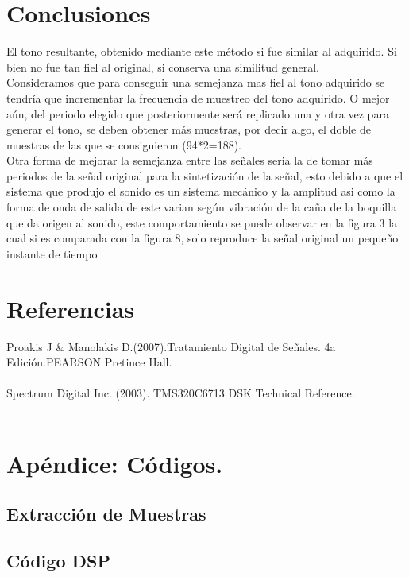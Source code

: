 \documentclass[12pt]{article}
\begin{document}
\section{Conclusiones}
El tono resultante, obtenido mediante este método si fue similar al adquirido. Si bien no fue tan fiel al original, si conserva una similitud general. 
\\
Consideramos que para conseguir una semejanza mas fiel al tono adquirido se tendría que incrementar la frecuencia de muestreo del tono adquirido. O mejor aún, del periodo elegido que posteriormente será replicado una y otra vez para generar el tono, se deben obtener más muestras, por decir algo, el doble de muestras de las que se consiguieron (94*2=188).
\\
Otra forma de mejorar la semejanza entre las señales seria la de tomar más periodos de la señal original para la sintetización de la señal, esto debido a que el sistema que produjo el sonido es un sistema mecánico y la amplitud asi como la forma de onda de salida de este varian según vibración de la caña de la boquilla que da origen al sonido, este comportamiento se puede observar en la figura 3 la cual si es comparada con la figura 8, solo reproduce la señal original un pequeño instante de tiempo

\section{Referencias}

  Proakis J $\&$ Manolakis D.(2007).Tratamiento Digital de Señales. 4a Edición.PEARSON Pretince Hall.
  \\\\
  Spectrum Digital Inc. (2003). TMS320C6713 DSK Technical Reference.
  \\\\

\section{Apéndice: Códigos.}
\subsection{Extracción de Muestras}

\subsection{Código DSP}

\end{document}
